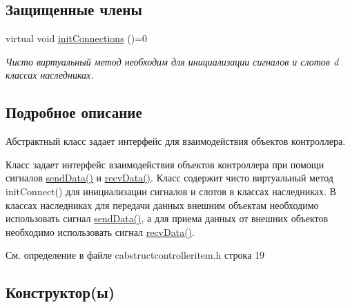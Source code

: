 \subsection*{Защищенные члены}
\begin{DoxyCompactItemize}
\item 
virtual void \hyperlink{class_c_abstruct_controller_item_a27c6889230a86cb0782e6d7596b883c1}{init\+Connections} ()=0
\begin{DoxyCompactList}\small\item\em Чисто виртуальный метод необходим для инициализации сигналов и слотов d классах наследниках. \end{DoxyCompactList}\end{DoxyCompactItemize}


\subsection{Подробное описание}
Абстрактный класс задает интерфейс для взаимодействия объектов контроллера. 

Класс задает интерфейс взаимодействия объектов контроллера при помощи сигналов \hyperlink{class_c_abstruct_controller_item_a7cf2bebc87a7d0b660318e946a176eb9}{send\+Data()} и \hyperlink{class_c_abstruct_controller_item_a6898e48061cb0cac2065f8193bd386c1}{recv\+Data()}. Класс содержит чисто виртуальный метод init\+Connect() для инициализации сигналов и слотов в классах наследниках. В классах наследниках для передачи данных внешним объектам необходимо использовать сигнал \hyperlink{class_c_abstruct_controller_item_a7cf2bebc87a7d0b660318e946a176eb9}{send\+Data()}, а для приема данных от внешних объектов необходимо использовать сигнал \hyperlink{class_c_abstruct_controller_item_a6898e48061cb0cac2065f8193bd386c1}{recv\+Data()}. 

См. определение в файле cabstructcontrolleritem.\+h строка 19



\subsection{Конструктор(ы)}
\hypertarget{class_c_abstruct_controller_item_a1d99654a9522cc8721a329d1dcee35a4}{}\label{class_c_abstruct_controller_item_a1d99654a9522cc8721a329d1dcee35a4} 
